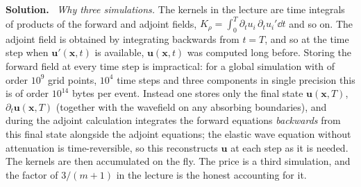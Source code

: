 \documentclass[a4paper,12pt]{paper}
\newenvironment{solution}{\par\noindent\textbf{Solution.}\ }{\par\medskip}
\begin{document}
\begin{solution}
\emph{Why three simulations.} The kernels in the lecture are time integrals of products of the forward and adjoint fields,
$K_{\rho}=\int_{0}^{T}\partial_{t}u_{i}\,\partial_{t}u_{i}'\dd t$ and so on. The adjoint field is obtained by integrating
backwards from $t=T$, and so at the time step when $\mathbf{u}'(\mathbf{x},t)$ is available, $\mathbf{u}(\mathbf{x},t)$ was
computed long before. Storing the forward field at every time step is impractical: for a global simulation with of order
$10^{9}$ grid points, $10^{4}$ time steps and three components in single precision this is of order
$10^{14}$ bytes per event. Instead one stores only the final state $\mathbf{u}(\mathbf{x},T)$, $\partial_{t}\mathbf{u}(\mathbf{x},T)$
(together with the wavefield on any absorbing boundaries), and during the adjoint calculation integrates the forward
equations \emph{backwards} from this final state alongside the adjoint equations; the elastic wave equation without
attenuation is time-reversible, so this reconstructs $\mathbf{u}$ at each step as it is needed. The kernels are then
accumulated on the fly. The price is a third simulation, and the factor of $3/(m+1)$ in the lecture is the honest
accounting for it.
\end{solution}
\end{document}
